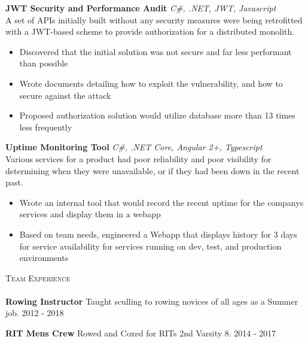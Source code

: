 \documentclass[a4paper]{article}
\newcommand{\lineunder} {
    \vspace*{-8pt} \\
    \hspace*{-18pt} \hrulefill \\
}
\newcommand{\header} [1] {
    {\hspace*{-18pt}\vspace*{6pt} \textsc{#1}}
    \vspace*{-6pt} \lineunder
}
\begin{document}
\begin{addmargin}[1em]{2em}%
{\textbf{JWT Security and Performance Audit}} {\sl C\#, .NET, JWT, Javascript} \\
A set of APIs initially built without any security measures were being retrofitted with a JWT-based scheme to provide authorization for a distributed monolith.
\vspace*{-2mm}
\begin{itemize}[leftmargin=4.5mm] \itemsep -1mm
	\item Discovered that the initial solution was not secure and far less performant than possible
	\item Wrote documents detailing how to exploit the vulnerability, and how to secure against the attack%
    \item Proposed authorization solution would utilize database more than 13 times less frequently
\end{itemize}
\vspace*{2mm}

{\textbf{Uptime Monitoring Tool}} {\sl C\#, .NET Core, Angular 2+, Typescript} \\
Various services for a product had poor reliability and poor visibility for determining when they were unavailable, or if they had been down in the recent past.
\vspace*{-2mm}
\begin{itemize}[leftmargin=4.5mm] \itemsep -1mm 
	\item Wrote an internal tool that would record the recent uptime for the company\textquotesingle{}s services and display them in a webapp
    \item Based on team needs, engineered a Webapp that displays history for 3 days for service availability for services running on dev, test, and production environments
\end{itemize}
\vspace*{2mm}
\end{addmargin}


\header{Team Experience}
\textbf{Rowing Instructor}
Taught sculling to rowing novices of all ages as a Summer job. \hfill 2012 - 2018\\
\vspace*{2mm}

\textbf{RIT Men\textquotesingle{}s Crew}
Rowed and Coxed for RIT\textquotesingle{}s 2nd Varsity 8. \hfill  2014 - 2017\\
\vspace*{2mm}
\end{document}
